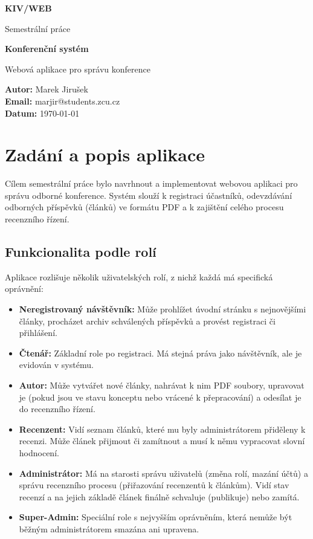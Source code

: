 \documentclass[12pt,a4paper]{article}
\makeatletter
\renewcommand{\maketitle}{%
 \begin{titlepage}
  \centering
  \vspace*{3cm}
  {\Huge\bfseries KIV/WEB}\par
  \vspace{0.5cm}
  {\Large Semestrální práce}\par
  \vspace{1.5cm}
  {\Large \textbf{Konferenční systém}}\par
  \vspace{0.5cm}
  {Webová aplikace pro správu konference}\par
  \vfill
  \begin{flushleft}
   \textbf{Autor:} Marek Jirušek\\
   \textbf{Email:} marjir@students.zcu.cz\\ %
   \textbf{Datum:} \today
  \end{flushleft}
 \end{titlepage}%
}
\makeatother
\begin{document}
\maketitle
\newpage

\tableofcontents
\newpage

\section{Zadání a popis aplikace}

Cílem semestrální práce bylo navrhnout a implementovat webovou aplikaci pro  správu odborné konference. Systém slouží k registraci účastníků, odevzdávání odborných příspěvků (článků) ve formátu PDF a k zajištění celého procesu recenzního řízení.



\subsection{Funkcionalita podle rolí}
Aplikace rozlišuje několik uživatelských rolí, z nichž každá má specifická oprávnění:

\begin{itemize}
    \item \textbf{Neregistrovaný návštěvník:} Může prohlížet úvodní stránku s nejnovějšími články, procházet archiv schválených příspěvků a provést registraci či přihlášení.
    \item \textbf{Čtenář:} Základní role po registraci. Má stejná práva jako návštěvník, ale je evidován v systému.
    \item \textbf{Autor:} Může vytvářet nové články, nahrávat k nim PDF soubory, upravovat je (pokud jsou ve stavu konceptu nebo vrácené k přepracování) a odesílat je do recenzního řízení.
    \item \textbf{Recenzent:} Vidí seznam článků, které mu byly administrátorem přiděleny k recenzi. Může článek přijmout či zamítnout a musí k němu vypracovat slovní hodnocení.
    \item \textbf{Administrátor:} Má na starosti správu uživatelů (změna rolí, mazání účtů) a správu recenzního procesu (přiřazování recenzentů k článkům). Vidí stav recenzí a na jejich základě článek finálně schvaluje (publikuje) nebo zamítá.
    \item \textbf{Super-Admin:} Speciální role s nejvyšším oprávněním, která nemůže být běžným administrátorem smazána ani upravena.
\end{itemize}
\end{document}
